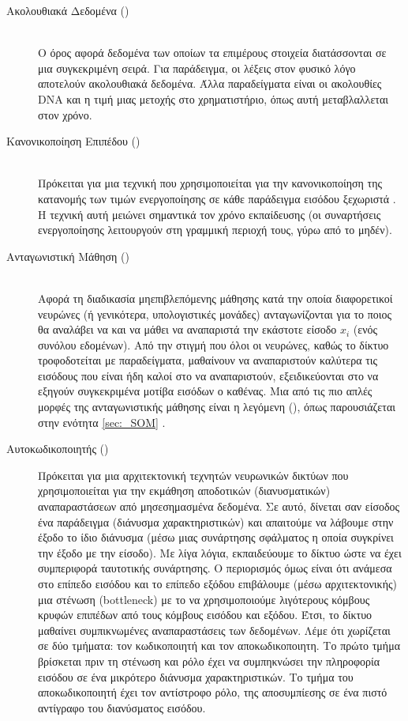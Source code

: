 \begin{description}
    \item[Ακολουθιακά Δεδομένα ()] \hfill \\ Ο όρος αφορά δεδομένα των οποίων τα επιμέρους στοιχεία διατάσσονται σε μια συγκεκριμένη σειρά. Για παράδειγμα, οι λέξεις στον φυσικό λόγο αποτελούν ακολουθιακά δεδομένα. Άλλα παραδείγματα είναι οι ακολουθίες DNA και η τιμή μιας μετοχής στο χρηματιστήριο, όπως αυτή μεταβλαλλεται στον χρόνο.
    \item[Κανονικοποίηση Επιπέδου ()] \hfill \\ Πρόκειται για μια τεχνική που χρησιμοποιείται για την κανονικοποίηση της κατανομής των τιμών ενεργοποίησης σε κάθε παράδειγμα εισόδου ξεχωριστά \cite{ba2016layer_normalization}. Η τεχνική αυτή μειώνει σημαντικά τον χρόνο εκπαίδευσης (οι συναρτήσεις ενεργοποίησης λειτουργούν στη γραμμική περιοχή τους, γύρω από το μηδέν).
    \item[Ανταγωνιστική Μάθηση ()] \hfill \\ Αφορά τη διαδικασία μη\textendash επιβλεπόμενης μάθησης κατά την οποία διαφορετικοί νευρώνες (ή γενικότερα, υπολογιστικές μονάδες) ανταγωνίζονται για το ποιος θα αναλάβει να  και να μάθει να αναπαριστά την εκάστοτε είσοδο $x_i$ (ενός συνόλου εδομένων). Από την στιγμή που όλοι οι νευρώνες, καθώς το δίκτυο τροφοδοτείται με παραδείγματα, μαθαίνουν να αναπαριστούν καλύτερα τις εισόδους που είναι ήδη καλοί στο να αναπαριστούν, εξειδικεύονται στο να εξηγούν συγκεκριμένα μοτίβα εισόδων ο καθένας. Μια από τις πιο απλές μορφές της ανταγωνιστικής μάθησης είναι η λεγόμενη  (), όπως παρουσιάζεται στην ενότητα \ref{sec:_SOM} \cite{sammut2011encyclopedia}.
    \item[Αυτοκωδικοποιητής ()] Πρόκειται για μια αρχιτεκτονική τεχνητών νευρωνικών δικτύων που χρησιμοποιείται για την εκμάθηση αποδοτικών (διανυσματικών) αναπαραστάσεων από μη\textendash σεσημασμένα δεδομένα. Σε αυτό, δίνεται σαν είσοδος ένα παράδειγμα (διάνυσμα χαρακτηριστικών) και απαιτούμε να λάβουμε στην έξοδο το ίδιο διάνυσμα (μέσω μιας συνάρτησης σφάλματος η οποία συγκρίνει την έξοδο με την είσοδο). Με λίγα λόγια, εκπαιδεύουμε το δίκτυο ώστε να έχει συμπεριφορά ταυτοτικής συνάρτησης. Ο περιορισμός όμως είναι ότι ανάμεσα στο επίπεδο εισόδου και το επίπεδο εξόδου επιβάλουμε (μέσω αρχιτεκτονικής) μια στένωση (bottleneck) με το να χρησιμοποιούμε λιγότερους κόμβους κρυφών επιπέδων από τους κόμβους εισόδου και εξόδου. Έτσι, το δίκτυο μαθαίνει συμπικνωμένες αναπαραστάσεις των δεδομένων. Λέμε ότι χωρίζεται σε δύο τμήματα: τον κωδικοποιητή και τον αποκωδικοποιητη. Το πρώτο τμήμα βρίσκεται πριν τη στένωση και ρόλο έχει να συμπηκνώσει την πληροφορία εισόδου σε ένα μικρότερο διάνυσμα χαρακτηριστικών. Το τμήμα του αποκωδικοποιητή έχει τον αντίστροφο ρόλο, της αποσυμπίεσης σε ένα πιστό αντίγραφο του διανύσματος εισόδου.
 \end{description}
